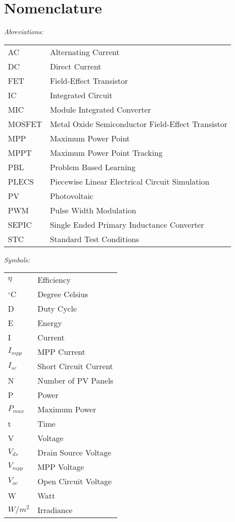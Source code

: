 \chapter*{Nomenclature}

\vspace{-10mm} %
\textit{Abreviations:}\newline
\begin{tabular}{ll} %
AC & Alternating Current\\
DC & Direct Current\\
FET & Field-Effect Transistor\\
IC & Integrated Circuit\\
MIC & Module Integrated Converter\\
MOSFET & Metal Oxide Semiconductor Field-Effect Transistor\\
MPP & Maximum Power Point\\
MPPT & Maximum Power Point Tracking\\
PBL & Problem Based Learning\\
PLECS & Piecewise Linear Electrical Circuit Simulation\\
PV & Photovoltaic\\
PWM & Pulse Width Modulation\\
SEPIC & Single Ended Primary Inductance Converter\\
STC & Standard Test Conditions\\
\end{tabular}

\vspace{5mm} %

\noindent\textit{Symbols:}\newline
\begin{tabular}{ll}
$\eta$ & Efficiency\\
$^\circ$C & Degree Celsius\\
D & Duty Cycle\\
E & Energy\\
I & Current\\
$I_{mpp}$ & MPP Current\\
$I_{sc}$ & Short Circuit Current\\
N & Number of PV Panels \\
P & Power\\
$P_{max}$ & Maximum Power\\
t & Time\\
V & Voltage\\
$V_{ds}$ & Drain Source Voltage\\
$V_{mpp}$ & MPP Voltage\\
$V_{oc}$ & Open Circuit Voltage\\
W & Watt\\
$W/m^2$ & Irradiance\\
\end{tabular}